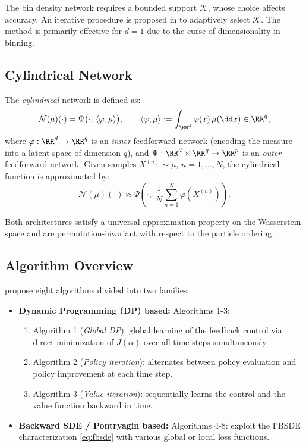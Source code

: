 \documentclass[11pt]{article}
\begin{document}
\begin{remark}
  The bin density network requires a bounded support $\mathcal{K}$, whose choice affects accuracy. An iterative procedure is proposed in \citet{pham2024mfnn} to adaptively select $\mathcal{K}$. The method is primarily effective for $d = 1$ due to the curse of dimensionality in binning.
\end{remark}

\subsection{Cylindrical Network}

The \emph{cylindrical} network is defined as:
\begin{equation}\label{eq:cylindrical}
  \mathcal{N}(\mu)(\cdot) = \Psi\big(\cdot, \, \langle \varphi, \mu \rangle\big), \qquad \langle \varphi, \mu \rangle := \int_{\RR^d} \varphi(x)\,\mu(\dd x) \in \RR^q,
\end{equation}
where $\varphi : \RR^d \to \RR^q$ is an \emph{inner} feedforward network (encoding the measure into a latent space of dimension $q$), and $\Psi : \RR^d \times \RR^q \to \RR^p$ is an \emph{outer} feedforward network. Given samples $X^{(n)} \sim \mu$, $n = 1, \ldots, N$, the cylindrical function is approximated by:
\begin{equation}
  \mathcal{N}(\mu)(\cdot) \approx \Psi\left(\cdot, \; \frac{1}{N}\sum_{n=1}^N \varphi(X^{(n)})\right).
\end{equation}

Both architectures satisfy a universal approximation property on the Wasserstein space and are permutation-invariant with respect to the particle ordering.

\subsection{Algorithm Overview}

\citet{pham2024mfnn} propose eight algorithms divided into two families:
\begin{itemize}
  \item \textbf{Dynamic Programming (DP) based:} Algorithms 1-3:
    \begin{enumerate}
      \item Algorithm 1 (\emph{Global DP}): global learning of the feedback control via direct minimization of $J(\alpha)$ over all time steps simultaneously.
      \item Algorithm 2 (\emph{Policy iteration}): alternates between policy evaluation and policy improvement at each time step.
      \item Algorithm 3 (\emph{Value iteration}): sequentially learns the control and the value function backward in time.
    \end{enumerate}
  \item \textbf{Backward SDE / Pontryagin based:} Algorithms 4-8: exploit the FBSDE characterization \eqref{eq:fbsde} with various global or local loss functions.
\end{itemize}
\end{document}
